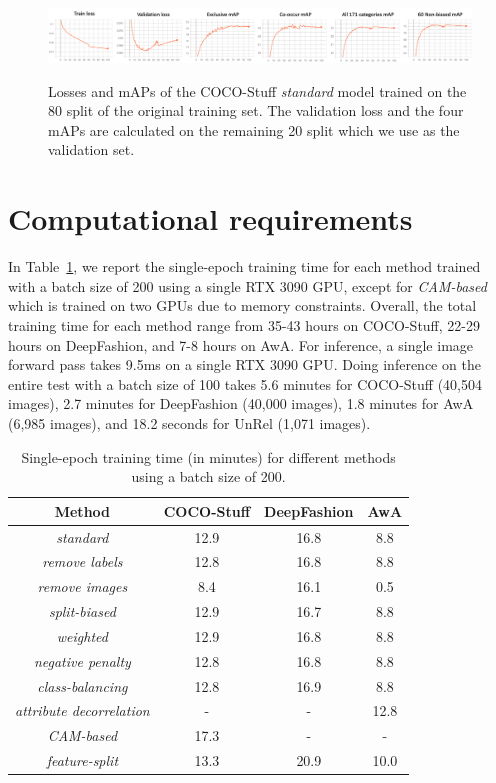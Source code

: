 \begin{figure}[h!]
\centering
\caption{Losses and mAPs of the COCO-Stuff \textit{standard} model trained on the 80 split of the original training set. The validation loss and the four mAPs are calculated on the remaining 20 split which we use as the validation set.}
\includegraphics[width=\linewidth]{../openreview/images/baseline.png}
\label{fig:baselinetraining}
\end{figure}


\section{Computational requirements} \label{sec:computationalrequirements}

In Table~\ref{tab:trainingtime}, we report the single-epoch training time for each method trained with a batch size of 200 using a single RTX 3090 GPU, except for \textit{CAM-based} which is trained on two GPUs due to memory constraints. Overall, the total training time for each method range from 35-43 hours on COCO-Stuff, 22-29 hours on DeepFashion, and 7-8 hours on AwA.
For inference, a single image forward pass takes 9.5ms on a single RTX 3090 GPU. 
Doing inference on the entire test with a batch size of 100 takes 5.6 minutes for COCO-Stuff (40,504 images), 2.7 minutes for DeepFashion (40,000 images), 1.8 minutes for AwA (6,985 images), and 18.2 seconds for UnRel (1,071 images).

\begin{table}[h!]
\centering
\caption{Single-epoch training time (in minutes) for different methods using a batch size of 200.}
\label{tab:trainingtime}
\begin{tabular}{|c|ccc|}
\hline
Method & COCO-Stuff & DeepFashion & AwA  \\
\hline
\textit{standard}         & 12.9 & 16.8 & 8.8 \\
\hline
\textit{remove labels}    & 12.8 & 16.8 & 8.8 \\
\textit{remove images}    & 8.4  & 16.1 & 0.5 \\
\textit{split-biased}     & 12.9 & 16.7 & 8.8 \\
\textit{weighted}         & 12.9 & 16.8 & 8.8 \\
\textit{negative penalty} & 12.8 & 16.8 & 8.8 \\
\textit{class-balancing}  & 12.8 & 16.9 & 8.8 \\
\textit{attribute decorrelation}  & - & - & 12.8  \\
\hline
\textit{CAM-based}        & 17.3  & - & - \\
\textit{feature-split}    & 13.3 & 20.9 & 10.0\\
\hline
\end{tabular}
\end{table}


